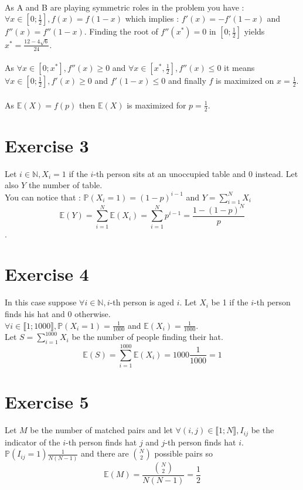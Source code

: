 \documentclass{article}
\begin{document}
    \\
    As A and B are playing symmetric roles in the problem you have :
    \\
    $\forall x\in[0;\frac{1}{2}],f(x) = f(1-x)$ which implies : $f'(x) = -f'(1-x)$ and $f''(x) = f''(1-x)$. Finding the root of $f''(x^*)=0$ in $[0;\frac{1}{2}]$ yields $x^* = \frac{12-4\sqrt{6}}{24}$.
    \\\\
    As $\forall x\in[0;x^*],f''(x)\ge 0$ and $\forall x\in[x^*,\frac{1}{2}], f''(x)\leq 0$ it means $\forall x\in[0;\frac{1}{2}], f'(x)\ge 0$ and $f'(1-x)\leq 0$ and finally $f$ is maximized on $x=\frac{1}{2}$.
    \\\\
    As $\mathbb{E}(X) = f(p)$ then $\mathbb{E}(X)$ is maximized for $p=\frac{1}{2}$.
    \\
    \section*{Exercise 3}
    Let $i\in\mathbb{N},X_i = 1$ if the $i$-th person sits at an unoccupied table and 0 instead. Let also $Y$ the number of table.
    \\
    You can notice that : $\mathbb{P}(X_i = 1) = (1-p)^{i-1}$ and $Y = \sum\limits_{i=1}^NX_i$
    \\
    $$\boxed{\mathbb{E}(Y) = \sum\limits_{i=1}^N \mathbb{E}(X_i) = \sum\limits_{i=1}^N p^{i-1} = \frac{1-(1-p)^N}{p}}$$.
    \section*{Exercise 4}
    In this case suppose $\forall i \in \mathbb{N},i$-th person is aged $i$. Let $X_i$ be 1 if the $i$-th person finds his hat and 0 otherwise.
    \\
    $\forall i \in \llbracket 1;1000\rrbracket, \mathbb{P}(X_i = 1) = \frac{1}{1000}$ and $\mathbb{E}(X_i) = \frac{1}{1000}$.
    \\
    Let $S = \sum\limits_{i=1}^{1000}X_i$ be the number of people finding their hat. $$\boxed{\mathbb{E}(S) = \sum\limits_{i=1}^{1000}\mathbb{E}(X_i) = 1000\frac{1}{1000} = 1}$$
    \section*{Exercise 5}
    Let $M$ be the number of matched pairs and let $\forall (i,j)\in\llbracket 1;N \rrbracket, I_{ij}$ be the indicator of the $i$-th person finds hat $j$ and $j$-th person finds hat $i$.
    $\mathbb{P}(I_{ij} = 1) \frac{1}{N(N-1)}$ and there are $\binom{N}{2}$ possible pairs so $$\boxed{\mathbb{E}(M) = \frac{\binom{N}{2}}{N(N-1)} = \frac{1}{2}}$$ 
\end{document}
